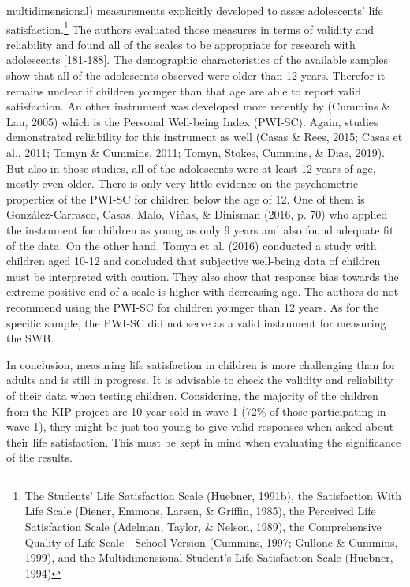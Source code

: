 \documentclass[a4, 12pt]{article}
\let\rmarkdownfootnote\footnote%
\def\footnote{\protect\rmarkdownfootnote}
\begin{document}
multidimensional) measurements explicitly developed to asses adolescents' life satisfaction.\footnote{The Students' Life Satisfaction Scale (Huebner, 1991b), the Satisfaction With Life Scale (Diener, Emmons, Larsen, \& Griffin, 1985), the Perceived Life Satisfaction Scale (Adelman, Taylor, \& Nelson, 1989), the Comprehensive Quality of Life Scale - School Version (Cummins, 1997; Gullone \& Cummins, 1999), and the Multidimensional Student's Life Satisfaction Scale (Huebner, 1994)} The authors evaluated those measures in terms of validity and reliability and found all of the scales to be appropriate for research with adolescents {[}181-188{]}. The demographic characteristics of the available samples show that all of the adolescents observed were older than 12 years. Therefor it remains unclear if children younger than that age are able to report valid satisfaction.
An other instrument was developed more recently by (Cummins \& Lau, 2005) which is the Personal Well-being Index (PWI-SC). Again, studies demonstrated reliability for this instrument as well (Casas \& Rees, 2015; Casas et al., 2011; Tomyn \& Cummins, 2011; Tomyn, Stokes, Cummins, \& Dias, 2019). But also in those studies, all of the adolescents were at least 12 years of age, mostly even older. There is only very little evidence on the psychometric properties of the PWI-SC for children below the age of 12.
One of them is González-Carrasco, Casas, Malo, Viñas, \& Dinisman (2016, p. 70) who applied the instrument for children as young as only 9 years and also found adequate fit of the data.
On the other hand, Tomyn et al. (2016) conducted a study with children aged 10-12 and concluded that subjective well-being data of children must be interpreted with caution. They also show that response bias towards the extreme positive end of a scale is higher with decreasing age. The authors do not recommend using the PWI-SC for children younger than 12 years. As for the specific sample, the PWI-SC did not serve as a valid instrument for measuring the SWB.

In conclusion, measuring life satisfaction in children is more challenging than for adults and is still in progress. It is advisable to check the validity and reliability of their data when testing children. Considering, the majority of the children from the KIP project are 10 year sold in wave 1 (72\% of those participating in wave 1), they might be just too young to give valid responses when asked about their life satisfaction. This must be kept in mind when evaluating the significance of the results.
\end{document}
